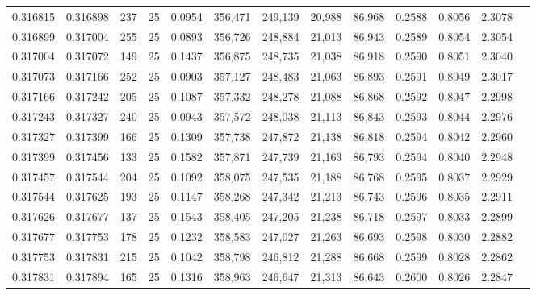 \begin{tabular}{rrrrrrrrrrrrr}
0.316815 & 0.316898 &   237 &  25 &                                     0.0954 & 356,471 & 249,139 &  20,988 &  86,968 & 0.2588 & 0.8056 & 2.3078 \\
0.316899 & 0.317004 &   255 &  25 &                                     0.0893 & 356,726 & 248,884 &  21,013 &  86,943 & 0.2589 & 0.8054 & 2.3054 \\
0.317004 & 0.317072 &   149 &  25 &                                     0.1437 & 356,875 & 248,735 &  21,038 &  86,918 & 0.2590 & 0.8051 & 2.3040 \\
0.317073 & 0.317166 &   252 &  25 &                                     0.0903 & 357,127 & 248,483 &  21,063 &  86,893 & 0.2591 & 0.8049 & 2.3017 \\
0.317166 & 0.317242 &   205 &  25 &                                     0.1087 & 357,332 & 248,278 &  21,088 &  86,868 & 0.2592 & 0.8047 & 2.2998 \\
0.317243 & 0.317327 &   240 &  25 &                                     0.0943 & 357,572 & 248,038 &  21,113 &  86,843 & 0.2593 & 0.8044 & 2.2976 \\
0.317327 & 0.317399 &   166 &  25 &                                     0.1309 & 357,738 & 247,872 &  21,138 &  86,818 & 0.2594 & 0.8042 & 2.2960 \\
0.317399 & 0.317456 &   133 &  25 &                                     0.1582 & 357,871 & 247,739 &  21,163 &  86,793 & 0.2594 & 0.8040 & 2.2948 \\
0.317457 & 0.317544 &   204 &  25 &                                     0.1092 & 358,075 & 247,535 &  21,188 &  86,768 & 0.2595 & 0.8037 & 2.2929 \\
0.317544 & 0.317625 &   193 &  25 &                                     0.1147 & 358,268 & 247,342 &  21,213 &  86,743 & 0.2596 & 0.8035 & 2.2911 \\
0.317626 & 0.317677 &   137 &  25 &                                     0.1543 & 358,405 & 247,205 &  21,238 &  86,718 & 0.2597 & 0.8033 & 2.2899 \\
0.317677 & 0.317753 &   178 &  25 &                                     0.1232 & 358,583 & 247,027 &  21,263 &  86,693 & 0.2598 & 0.8030 & 2.2882 \\
0.317753 & 0.317831 &   215 &  25 &                                     0.1042 & 358,798 & 246,812 &  21,288 &  86,668 & 0.2599 & 0.8028 & 2.2862 \\
0.317831 & 0.317894 &   165 &  25 &                                     0.1316 & 358,963 & 246,647 &  21,313 &  86,643 & 0.2600 & 0.8026 & 2.2847 \\

\end{tabular}

